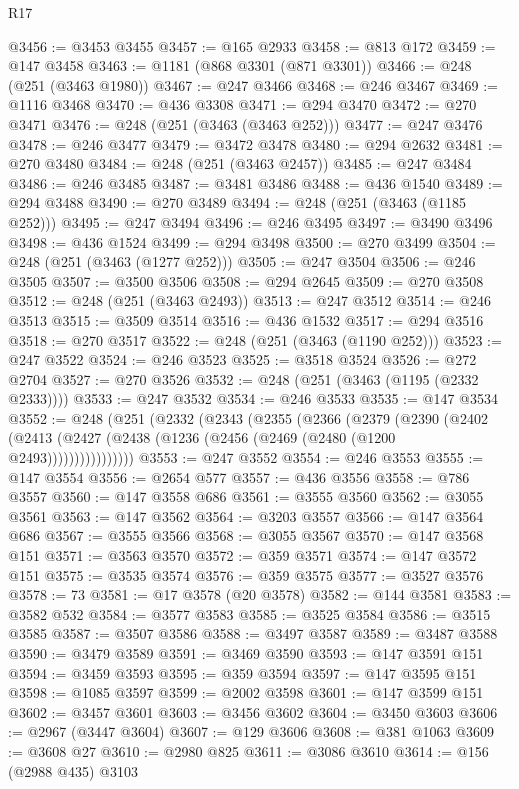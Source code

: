 \begin{lexlean}{R17}
\begin{coremodule}
@3456 := @3453 @3455
@3457 := @165 @2933
@3458 := @813 @172
@3459 := @147 @3458
@3463 := @1181 (@868 @3301 (@871 @3301))
@3466 := @248 (@251 (@3463 @1980))
@3467 := @247 @3466
@3468 := @246 @3467
@3469 := @1116 @3468
@3470 := @436 @3308
@3471 := @294 @3470
@3472 := @270 @3471
@3476 := @248 (@251 (@3463 (@3463 @252)))
@3477 := @247 @3476
@3478 := @246 @3477
@3479 := @3472 @3478
@3480 := @294 @2632
@3481 := @270 @3480
@3484 := @248 (@251 (@3463 @2457))
@3485 := @247 @3484
@3486 := @246 @3485
@3487 := @3481 @3486
@3488 := @436 @1540
@3489 := @294 @3488
@3490 := @270 @3489
@3494 := @248 (@251 (@3463 (@1185 @252)))
@3495 := @247 @3494
@3496 := @246 @3495
@3497 := @3490 @3496
@3498 := @436 @1524
@3499 := @294 @3498
@3500 := @270 @3499
@3504 := @248 (@251 (@3463 (@1277 @252)))
@3505 := @247 @3504
@3506 := @246 @3505
@3507 := @3500 @3506
@3508 := @294 @2645
@3509 := @270 @3508
@3512 := @248 (@251 (@3463 @2493))
@3513 := @247 @3512
@3514 := @246 @3513
@3515 := @3509 @3514
@3516 := @436 @1532
@3517 := @294 @3516
@3518 := @270 @3517
@3522 := @248 (@251 (@3463 (@1190 @252)))
@3523 := @247 @3522
@3524 := @246 @3523
@3525 := @3518 @3524
@3526 := @272 @2704
@3527 := @270 @3526
@3532 := @248 (@251 (@3463 (@1195 (@2332 @2333))))
@3533 := @247 @3532
@3534 := @246 @3533
@3535 := @147 @3534
@3552 := @248
    (@251
      (@2332
        (@2343
          (@2355
            (@2366
              (@2379
                (@2390
                  (@2402
                    (@2413 (@2427 (@2438 (@1236 (@2456 (@2469 (@2480 (@1200 @2493))))))))))))))))
@3553 := @247 @3552
@3554 := @246 @3553
@3555 := @147 @3554
@3556 := @2654 @577
@3557 := @436 @3556
@3558 := @786 @3557
@3560 := @147 @3558 @686
@3561 := @3555 @3560
@3562 := @3055 @3561
@3563 := @147 @3562
@3564 := @3203 @3557
@3566 := @147 @3564 @686
@3567 := @3555 @3566
@3568 := @3055 @3567
@3570 := @147 @3568 @151
@3571 := @3563 @3570
@3572 := @359 @3571
@3574 := @147 @3572 @151
@3575 := @3535 @3574
@3576 := @359 @3575
@3577 := @3527 @3576
@3578 := 73
@3581 := @17 @3578 (@20 @3578)
@3582 := @144 @3581
@3583 := @3582 @532
@3584 := @3577 @3583
@3585 := @3525 @3584
@3586 := @3515 @3585
@3587 := @3507 @3586
@3588 := @3497 @3587
@3589 := @3487 @3588
@3590 := @3479 @3589
@3591 := @3469 @3590
@3593 := @147 @3591 @151
@3594 := @3459 @3593
@3595 := @359 @3594
@3597 := @147 @3595 @151
@3598 := @1085 @3597
@3599 := @2002 @3598
@3601 := @147 @3599 @151
@3602 := @3457 @3601
@3603 := @3456 @3602
@3604 := @3450 @3603
@3606 := @2967 (@3447 @3604)
@3607 := @129 @3606
@3608 := @381 @1063
@3609 := @3608 @27
@3610 := @2980 @825
@3611 := @3086 @3610
@3614 := @156 (@2988 @435) @3103

\end{coremodule}
\end{lexlean}
